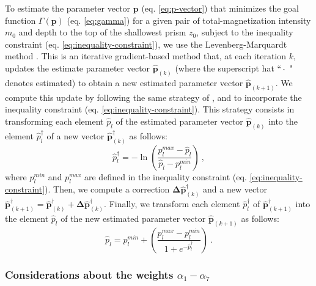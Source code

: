 To estimate the parameter vector $\mathbf{p}$ (eq. \ref{eq:p-vector}) that minimizes 
the goal function $\Gamma(\mathbf{p})$ (eq. \ref{eq:gamma}) 
for a given pair of total-magnetization intensity $m_{0}$ and depth to the top of the 
shallowest prism $z_{0}$, 
subject to the inequality constraint (eq. \ref{eq:inequality-constraint}), we use the Levenberg-Marquardt method \cite[e.g., ][ p. 240]{aster-etal2019}. 
This is an iterative gradient-based method that, at each iteration $k$, updates the estimate parameter vector $\hat{\mathbf{p}}_{(k)}$ (where the superscript hat ``~$\hat{}$~" denotes estimated) 
to obtain a new estimated parameter vector $\hat{\mathbf{p}}_{(k+1)}$.
We compute this update by following the same strategy of \cite{barbosa-1999b}, \cite{oliveirajr-etal2011} and \cite{oliveirajr-barbosa2013} to incorporate the inequality constraint (eq. \ref{eq:inequality-constraint}). This strategy consists in transforming each element $\hat{p}_{l}$ of the estimated parameter vector 
$\hat{\mathbf{p}}_{(k)}$ into the element $\hat{p}^{\dagger}_{l}$ of a new vector $\hat{\mathbf{p}}^{\dagger}_{(k)}$ as follows:
\begin{equation}\label{eq:inequality-function}
\hat{p}^{\dagger}_{l} = -\ln\left(\frac{p_{l}^{max} - \hat{p}_{l}}{\hat{p}_{l} - p_{l}^{min}}\right) \: ,
\end{equation}
where $p_{l}^{min}$ and $p_{l}^{max}$ are defined in the inequality constraint 
(eq. \ref{eq:inequality-constraint}).
Then, we compute a correction $\boldsymbol{\Delta}\hat{\mathbf{p}}^{\dagger}_{(k)}$ and a new vector 
$\hat{\mathbf{p}}^{\dagger}_{(k+1)} = \hat{\mathbf{p}}^{\dagger}_{(k)} + \boldsymbol{\Delta}\hat{\mathbf{p}}^{\dagger}_{(k)}$.
Finally, we transform each element $\hat{p}^{\dagger}_{l}$ of $\hat{\mathbf{p}}^{\dagger}_{(k+1)}$ into the element 
$\hat{p}_{l}$ of the new estimated parameter vector $\hat{\mathbf{p}}_{(k+1)}$ as follows:
\begin{equation}\label{eq:inv-inequality-function}
\hat{p}_{l} = p_{l}^{min} + \left(\frac{p_{l}^{max} - p_{l}^{min}}{ 1 + e^{-\hat{p}^{\dagger}_{l}} }\right) \: .
\end{equation}


\subsubsection{Considerations about the weights $\alpha_{1}-\alpha_{7}$}

